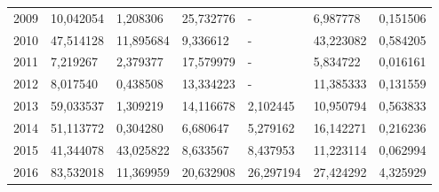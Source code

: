 \begin{table}
\begin{tabular}{p{1cm}p{2cm}p{2cm}p{2cm}p{2cm}p{2cm}p{2cm}}
 2009 &                                    10,042054 &                                    1,208306 &                   25,732776 &                              - &          6,987778 &            0,151506 \\
 2010 &                                    47,514128 &                                   11,895684 &                    9,336612 &                              - &         43,223082 &            0,584205 \\
 2011 &                                     7,219267 &                                    2,379377 &                   17,579979 &                              - &          5,834722 &            0,016161 \\
 2012 &                                     8,017540 &                                    0,438508 &                   13,334223 &                              - &         11,385333 &            0,131559 \\
 2013 &                                    59,033537 &                                    1,309219 &                   14,116678 &                       2,102445 &         10,950794 &            0,563833 \\
 2014 &                                    51,113772 &                                    0,304280 &                    6,680647 &                       5,279162 &         16,142271 &            0,216236 \\
 2015 &                                    41,344078 &                                   43,025822 &                    8,633567 &                       8,437953 &         11,223114 &            0,062994 \\
 2016 &                                    83,532018 &                                   11,369959 &                   20,632908 &                      26,297194 &         27,424292 &            4,325929 \\
\bottomrule
\end{tabular}
\end{table}

